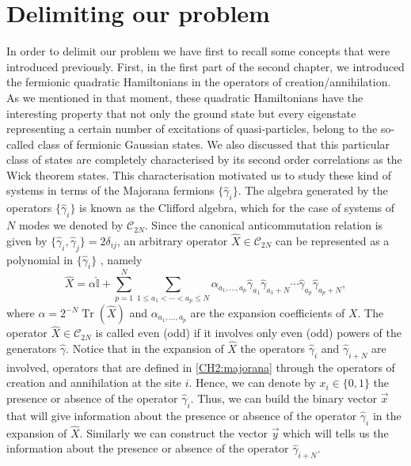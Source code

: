 \section{Delimiting our problem}
In order to delimit our problem we have first to recall some concepts that were introduced previously. First, in the first part of the second chapter, we introduced the fermionic quadratic Hamiltonians in the operators of creation/annihilation. As we mentioned in that moment, these quadratic Hamiltonians have the interesting property that not only the ground state but every eigenstate representing a certain number of 
excitations of quasi-particles, belong to the so-called class of fermionic Gaussian states. We also discussed that this particular class of states are completely characterised by its second order correlations as the Wick theorem states. This characterisation motivated us to study these kind of systems in terms of the Majorana fermions $\{\hat{\gamma}_i\}$. The algebra generated by the operators $\{\hat{\gamma}_i\}$ is known as the Clifford algebra, which for the case of systems of $N$ modes we denoted by $\mathcal{C}_{2N}$. Since the canonical anticommutation relation is given by $\{\hat{\gamma}_i,\hat{\gamma}_j\}=2\delta_{ij}$, an arbitrary operator $\hat{X}\in \mathcal{C}_{2N}$ can be represented as a polynomial in $\{\hat{\gamma}_i\}$ \cite{bravyi_lagrangian_2004}, namely
\begin{equation}
\hat{X}=\alpha\hat{\mathbb{I}} + \sum_{p=1}^{N}\sum_{1 \leq a_1< \cdots < a_p \leq N } \alpha_{a_1,\ldots,a_p}\hat{\gamma}_{a_1} \hat{\gamma}_{a_1+N}\cdots \hat{\gamma}_{a_p}\hat{\gamma}_{a_p+N},
\label{CH3:expantion_of_operators}
\end{equation}
where $\alpha=2^{-N}\operatorname{Tr}(\hat{X})$ and $\alpha_{a_1,\ldots,a_p}$ are the expansion coefficients of $X$. The operator $\hat{X}\in\mathcal{C}_{2N}$ is called even (odd) if it involves only even (odd) powers of the generators $\hat{\gamma}$. Notice that in the expansion of $\hat{X}$ the operators $\hat{\gamma}_{i}$ and $\hat{\gamma}_{i+N}$ are involved, operators that are defined in \eqref{CH2:majorana} through the operators of creation and annihilation at the site $i$. Hence, we can denote by $x_i \in \{0,1\}$ the presence or absence of the operator $\hat{\gamma}_i$. Thus, we can build the binary vector $\vec{x}$ that will give information about the presence or absence of the operator $\hat{\gamma}_i$ in the expansion of $\hat{X}$. Similarly we can construct the vector $\vec{y}$ which will tells us the information about the presence or absence of the operator $\hat{\gamma}_{i+N}$.
